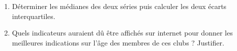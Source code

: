 \begin{exo}
	\begin{enumerate}[resume]
		\item Déterminer les médianes des deux séries puis calculer les deux écarts interquartiles.
		\item Quels indicateurs auraient dû être affichés sur internet pour donner les meilleures indications sur l'âge des membres de ces clubs ? Justifier.
	\end{enumerate}
\end{exo}
